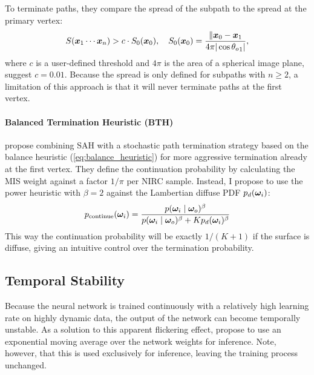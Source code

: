 To terminate paths, they compare the spread of the subpath to the spread at the primary vertex:
\begin{equation}
    S(\bm{x}_1 \cdots \bm{x}_n) > c \cdot S_0(\bm{x}_0), \quad S_0(\bm{x}_0) = \frac{\|\bm{x}_0 - \bm{x}_1}{4 \pi |\cos {\theta_o}_1|},
\end{equation}
where $c$ is a user-defined threshold and $4\pi$ is the area of a spherical image plane, \textcite{muller2021} suggest $c=0.01$.
Because the spread is only defined for subpaths with $n \geq 2$, a limitation of this approach is that it will never terminate paths at the first vertex.

\paragraph{Balanced Termination Heuristic (BTH)}
\label{par:pt_bth}
\textcite{dereviannykh2024} propose combining SAH with a stochastic path termination strategy based on the balance heuristic (\autoref{eq:balance_heuristic}) for more aggressive termination already at the first vertex.
They define the continuation probability by calculating the MIS weight against a factor $1/\pi$ per NIRC sample.
Instead, I propose to use the power heuristic with $\beta=2$ against the Lambertian diffuse PDF $p_d({\bm{\omega}_i})$:
\begin{equation}
    p_{\text{continue}}({\bm{\omega}_i}) = \frac{p({\bm{\omega}_i} \mid {\bm{\omega}_o})^\beta}{p({\bm{\omega}_i} \mid {\bm{\omega}_o})^\beta + K p_d({\bm{\omega}_i})^\beta}
\end{equation}
This way the continuation probability will be exactly $1/(K+1)$ if the surface is diffuse, giving an intuitive control over the termination probability.

\subsection{Temporal Stability}
Because the neural network is trained continuously with a relatively high learning rate on highly dynamic data, the output of the network can become temporally unstable.
As a solution to this apparent flickering effect, \textcite{muller2021} propose to use an exponential moving average over the network weights for inference.
Note, however, that this is used exclusively for inference, leaving the training process unchanged.